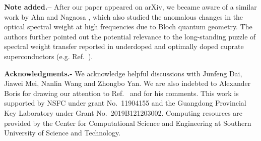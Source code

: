 \documentclass[prl,floatfix,twocolumn,showpacs,amsmath,superscriptaddress]{revtex4-2}
\begin{document}
{\bf Note added.--} After our paper appeared on arXiv, we became aware of a similar work by Ahn and Nagaosa \cite{Ahn:2021}, which also studied the anomalous changes in the optical spectral weight at high frequencies due to Bloch quantum geometry. The authors further pointed out the potential relevance to the long-standing puzzle of spectral weight transfer reported in underdoped and optimally doped cuprate superconductors (e.g. Ref.~\cite{Molegraaf:2002}).  

{\bf Acknowledgments.-} We acknowledge helpful discussions with Junfeng Dai, Jiawei Mei, Nanlin Wang and Zhongbo Yan. We are also indebted to Alexander Boris for drawing our attention to Ref.~\cite{CharnukhaPRB} and for his comments. This work is supported by NSFC under grant No.~11904155 and the Guangdong Provincial Key Laboratory under Grant No.~2019B121203002. Computing resources are provided by the Center for Computational Science and Engineering at Southern University of Science and Technology.
\end{document}
